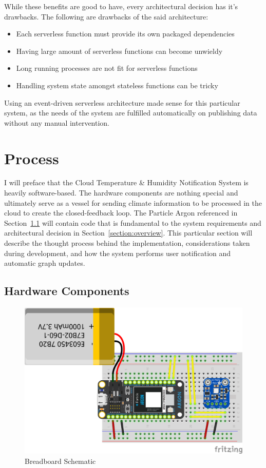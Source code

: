 \documentclass{article}
\begin{document}
While these benefits are good to have, every architectural decision has it's drawbacks. The following  are drawbacks of the said architecture:

\begin{itemize}
	\item Each serverless function must provide its own packaged dependencies
	\item Having large amount of serverless functions can become unwieldy
	\item Long running processes are not fit for serverless functions
	\item Handling system state amongst stateless functions can be tricky
\end{itemize}

Using an event-driven serverless architecture made sense for this particular system, as the needs of the system are fulfilled automatically on publishing data without any manual intervention.

\section{Process}
I will preface that the Cloud Temperature \& Humidity Notification System is heavily software-based. The hardware components are nothing special and ultimately serve as a vessel for sending climate information to be processed in the cloud to create the closed-feedback loop. The Particle Argon referenced in Section~\ref{section:hardware} will contain code that is fundamental to the system requirements and architectural decision in Section~\ref{section:overview}. This particular section will describe the thought process behind the implementation, considerations taken during development, and how the system performs user notification and automatic graph updates.

\subsection{Hardware Components}
\label{section:hardware}
\begin{figure}[H]
	\center
	\includegraphics[width=\textwidth]{images/breadboard-schematic.png}
	\caption{Breadboard Schematic}
	\label{fig:breadboard_schematic}
\end{figure}
\end{document}
